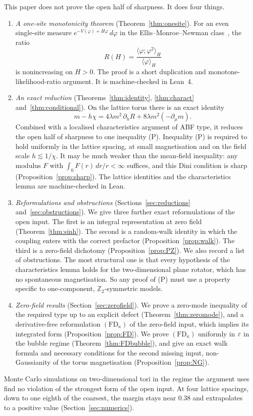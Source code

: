 This paper does not prove the open half of sharpness. It does four things.
\begin{enumerate}
\item \emph{A one-site monotonicity theorem} (Theorem~\ref{thm:onesite}). For an even single-site measure $e^{-V(\varphi)+H\varphi}\,d\varphi$ in the Ellis--Monroe--Newman class~\cite{EMN76}, the ratio
\[
R(H)=\frac{\langle\varphi;\varphi^2\rangle_H}{\langle\varphi\rangle_H}
\]
is nonincreasing on $H>0$. The proof is a short duplication and monotone-likelihood-ratio argument. It is machine-checked in Lean~4.
\item \emph{An exact reduction} (Theorems~\ref{thm:identity}, \ref{thm:charact} and~\ref{thm:conditional}). On the lattice torus there is an exact identity
\[
m-h\chi=4\lambda m^2\,\partial_hR+8\lambda m^2(-\partial_\mu m).
\]
Combined with a localised characteristics argument of ABF type, it reduces the open half of sharpness to one inequality (P). Inequality (P) is required to hold uniformly in the lattice spacing, at small magnetisation and on the field scale $h\lesssim 1/\chi$. It may be much weaker than the mean-field inequality: any modulus $F$ with $\int_0F(r)\,dr/r<\infty$ suffices, and this Dini condition is sharp (Proposition~\ref{prop:sharp}). The lattice identities and the characteristics lemma are machine-checked in Lean.
\item \emph{Reformulations and obstructions} (Sections~\ref{sec:reductions} and~\ref{sec:obstructions}). We give three further exact reformulations of the open input. The first is an integral representation at zero field (Theorem~\ref{thm:sinh}). The second is a random-walk identity in which the coupling enters with the correct prefactor (Proposition~\ref{prop:walk}). The third is a zero-field dichotomy (Proposition~\ref{prop:PZ}). We also record a list of obstructions. The most structural one is that every hypothesis of the characteristics lemma holds for the two-dimensional plane rotator, which has no spontaneous magnetisation. So any proof of (P) must use a property specific to one-component, $\mathbb Z_2$-symmetric models.
\item \emph{Zero-field results} (Section~\ref{sec:zerofield}). We prove a zero-mode inequality of the required type up to an explicit defect (Theorem~\ref{thm:zeromode}), and a derivative-free reformulation $(\mathrm{FD}_\kappa)$ of the zero-field input, which implies its integrated form (Proposition~\ref{prop:FD}). We prove $(\mathrm{FD}_\kappa)$ uniformly in $\varepsilon$ in the bubble regime (Theorem~\ref{thm:FDbubble}), and give an exact walk formula and necessary conditions for the second missing input, non-Gaussianity of the torus magnetisation (Proposition~\ref{prop:NG}).
\end{enumerate}
Monte Carlo simulations on two-dimensional tori in the regime the argument uses find no violation of the strongest form of the open input. At four lattice spacings, down to one eighth of the coarsest, the margin stays near $0.38$ and extrapolates to a positive value (Section~\ref{sec:numerics}).

